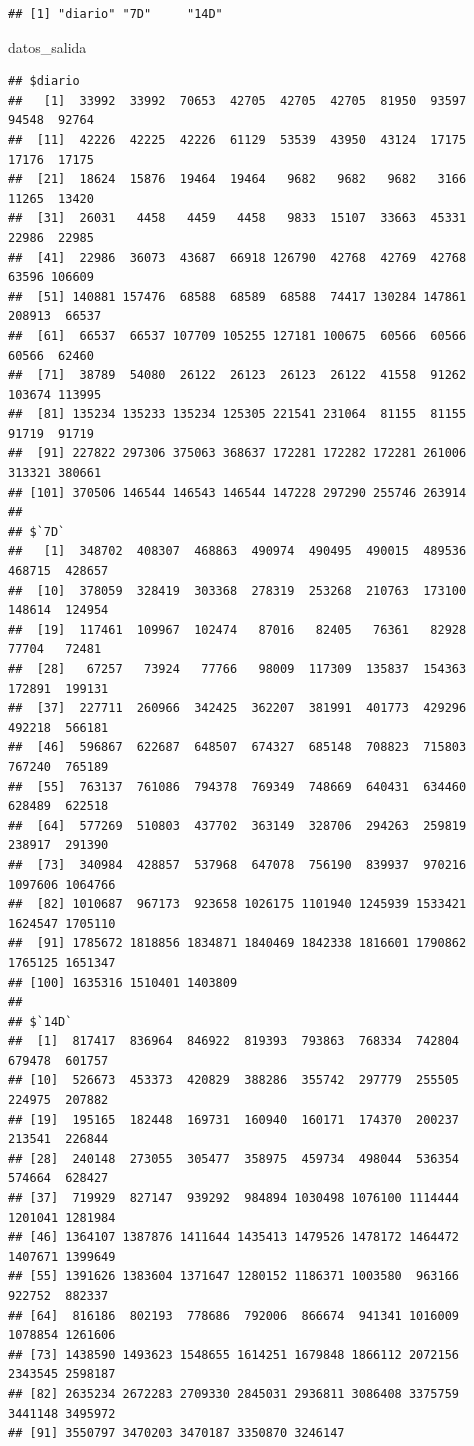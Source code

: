 \documentclass[11pt,]{book}
\newenvironment{Shaded}{\begin{snugshade}}{\end{snugshade}}
\newcommand{\NormalTok}[1]{#1}
\begin{document}
\begin{verbatim}
## [1] "diario" "7D"     "14D"
\end{verbatim}

\begin{Shaded}
\begin{Highlighting}[]
\NormalTok{datos_salida}
\end{Highlighting}
\end{Shaded}

\begin{verbatim}
## $diario
##   [1]  33992  33992  70653  42705  42705  42705  81950  93597  94548  92764
##  [11]  42226  42225  42226  61129  53539  43950  43124  17175  17176  17175
##  [21]  18624  15876  19464  19464   9682   9682   9682   3166  11265  13420
##  [31]  26031   4458   4459   4458   9833  15107  33663  45331  22986  22985
##  [41]  22986  36073  43687  66918 126790  42768  42769  42768  63596 106609
##  [51] 140881 157476  68588  68589  68588  74417 130284 147861 208913  66537
##  [61]  66537  66537 107709 105255 127181 100675  60566  60566  60566  62460
##  [71]  38789  54080  26122  26123  26123  26122  41558  91262 103674 113995
##  [81] 135234 135233 135234 125305 221541 231064  81155  81155  91719  91719
##  [91] 227822 297306 375063 368637 172281 172282 172281 261006 313321 380661
## [101] 370506 146544 146543 146544 147228 297290 255746 263914
## 
## $`7D`
##   [1]  348702  408307  468863  490974  490495  490015  489536  468715  428657
##  [10]  378059  328419  303368  278319  253268  210763  173100  148614  124954
##  [19]  117461  109967  102474   87016   82405   76361   82928   77704   72481
##  [28]   67257   73924   77766   98009  117309  135837  154363  172891  199131
##  [37]  227711  260966  342425  362207  381991  401773  429296  492218  566181
##  [46]  596867  622687  648507  674327  685148  708823  715803  767240  765189
##  [55]  763137  761086  794378  769349  748669  640431  634460  628489  622518
##  [64]  577269  510803  437702  363149  328706  294263  259819  238917  291390
##  [73]  340984  428857  537968  647078  756190  839937  970216 1097606 1064766
##  [82] 1010687  967173  923658 1026175 1101940 1245939 1533421 1624547 1705110
##  [91] 1785672 1818856 1834871 1840469 1842338 1816601 1790862 1765125 1651347
## [100] 1635316 1510401 1403809
## 
## $`14D`
##  [1]  817417  836964  846922  819393  793863  768334  742804  679478  601757
## [10]  526673  453373  420829  388286  355742  297779  255505  224975  207882
## [19]  195165  182448  169731  160940  160171  174370  200237  213541  226844
## [28]  240148  273055  305477  358975  459734  498044  536354  574664  628427
## [37]  719929  827147  939292  984894 1030498 1076100 1114444 1201041 1281984
## [46] 1364107 1387876 1411644 1435413 1479526 1478172 1464472 1407671 1399649
## [55] 1391626 1383604 1371647 1280152 1186371 1003580  963166  922752  882337
## [64]  816186  802193  778686  792006  866674  941341 1016009 1078854 1261606
## [73] 1438590 1493623 1548655 1614251 1679848 1866112 2072156 2343545 2598187
## [82] 2635234 2672283 2709330 2845031 2936811 3086408 3375759 3441148 3495972
## [91] 3550797 3470203 3470187 3350870 3246147
\end{verbatim}
\end{document}
